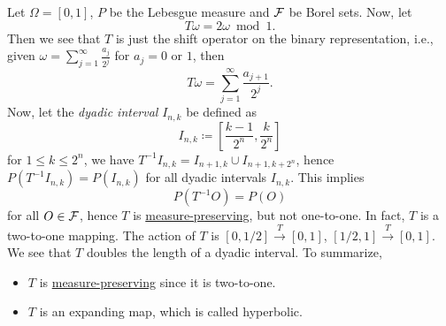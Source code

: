 \begin{eg}
	Let \(\Omega =[0, 1]\), \(P\) be the Lebesgue measure and \(\mathcal{\MakeUppercase{f}} \) be Borel sets. Now, let
	\[
		T \omega = 2 \omega \bmod 1.
	\]
	Then we see that \(T\) is just the shift operator on the binary representation, i.e., given \(\omega = \sum_{j=1} ^{\infty} \frac{a_{j} }{2^j}\) for \(a_j = 0\) or \(1\), then
	\[
		T \omega = \sum\limits_{j=1}^{\infty } \frac{a_{j+1}}{2^j}.
	\]
	Now, let the \emph{dyadic interval} \(I_{n, k}\) be defined as
	\[
		I_{n, k}\coloneqq \left[ \frac{k-1}{2^n}, \frac{k}{2^n} \right]
	\]
	for \(1 \leq k \leq 2^n\), we have \(T^{-1} I_{n, k} = I_{n+1, k} \cup I_{n+1, k+ 2^n}\), hence \(P(T^{-1} I_{n, k}) = P(I_{n, k})\) for all dyadic intervals \(I_{n, k}\). This implies
	\[
		P(T^{-1} O) = P(O)
	\]
	for all \(O\in \mathcal{\MakeUppercase{f}} \), hence \(T\) is \hyperref[def:measure-preserving]{measure-preserving}, but not one-to-one. In fact, \(T\) is a two-to-one mapping. The action of \(T\) is \([0, 1 / 2] \overset{T}{\to} [0, 1]\), \([1 / 2, 1] \overset{T}{\to} [0, 1]\). We see that \(T\) doubles the length of a dyadic interval. To summarize,
	\begin{itemize}
		\item \(T\) is \hyperref[def:measure-preserving]{measure-preserving} since it is two-to-one.
		\item \(T\) is an expanding map, which is called hyperbolic.
	\end{itemize}
\end{eg}